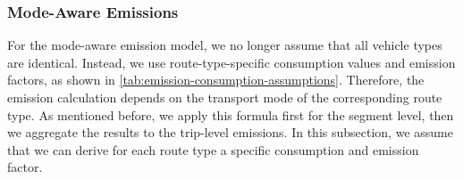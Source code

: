 \subsubsection{Mode-Aware Emissions}
For the mode-aware emission model, we no longer assume that all vehicle types are identical. Instead, we use route-type-specific consumption values and emission factors, as shown in \autoref{tab:emission-consumption-assumptions}. Therefore, the emission calculation depends on the transport mode of the corresponding route type.
As mentioned before, we apply this formula first for the segment level, then we aggregate the results to the trip-level emissions. 
In this subsection, we assume that we can derive for each route type a specific consumption and emission factor. 


